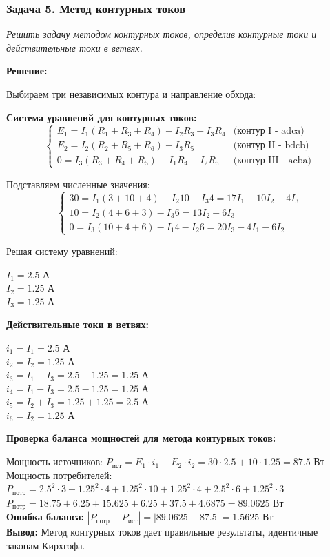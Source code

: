 \subsubsection{Задача 5. Метод контурных токов}
\textit{Решить задачу методом контурных токов, определив контурные токи и действительные токи в ветвях.}

\textbf{Решение:}

Выбираем три независимых контура и направление обхода:

\textbf{Система уравнений для контурных токов:}
$$\begin{cases}
E_1 = I_1 (R_1 + R_3 + R_4) - I_2R_3 - I_3R_4 & \text{(контур I - adca)} \\
E_2 = I_2 (R_2 + R_5 + R_6) - I_3R_5 & \text{(контур II - bdcb)} \\
0 = I_3 (R_3 + R_4 + R_5) - I_1R_4 - I_2R_5 & \text{(контур III - acba)}
\end{cases}$$

Подставляем численные значения:
$$\begin{cases}
30 = I_1 (3 + 10 + 4) - I_2 10 - I_3 4 = 17I_1 - 10I_2 - 4I_3 \\
10 = I_2 (4 + 6 + 3) - I_3 6 = 13I_2 - 6I_3 \\
0 = I_3 (10 + 4 + 6) - I_1 4 - I_2 6 = 20I_3 - 4I_1 - 6I_2
\end{cases}$$

Решая систему уравнений:
\begin{flushleft}
$I_1 = 2.5$ А \\
$I_2 = 1.25$ А \\
$I_3 = 1.25$ А
\end{flushleft}

\textbf{Действительные токи в ветвях:}
\begin{flushleft}
$i_1 = I_1 = 2.5$ А \\
$i_2 = I_2 = 1.25$ А \\
$i_3 = I_1 - I_3 = 2.5 - 1.25 = 1.25$ А \\
$i_4 = I_1 - I_3 = 2.5 - 1.25 = 1.25$ А \\
$i_5 = I_2 + I_3 = 1.25 + 1.25 = 2.5$ А \\
$i_6 = I_2 = 1.25$ А
\end{flushleft}

\textbf{Проверка баланса мощностей для метода контурных токов:}
\begin{flushleft}
Мощность источников: $P_{ист} = E_1 \cdot i_1 + E_2 \cdot i_2 = 30 \cdot 2.5 + 10 \cdot 1.25 = 87.5$ Вт \\
Мощность потребителей: $P_{потр} = 2.5^2 \cdot 3 + 1.25^2 \cdot 4 + 1.25^2 \cdot 10 + 1.25^2 \cdot 4 + 2.5^2 \cdot 6 + 1.25^2 \cdot 3$ \\
$P_{потр} = 18.75 + 6.25 + 15.625 + 6.25 + 37.5 + 4.6875 = 89.0625$ Вт \\
\textbf{Ошибка баланса:} $|P_{потр} - P_{ист}| = |89.0625 - 87.5| = 1.5625$ Вт \\
\textbf{Вывод:} Метод контурных токов дает правильные результаты, идентичные законам Кирхгофа.
\end{flushleft}

